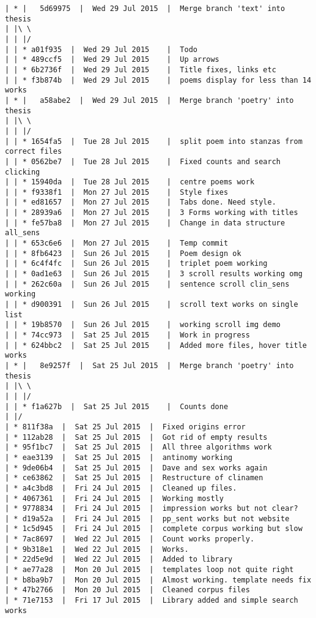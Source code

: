 \begin{verbatim}
| * |   5d69975  |  Wed 29 Jul 2015	 |  Merge branch 'text' into thesis
| |\ \  
| | |/  
| | * a01f935  |  Wed 29 Jul 2015	 |  Todo
| | * 489ccf5  |  Wed 29 Jul 2015	 |  Up arrows
| | * 6b2736f  |  Wed 29 Jul 2015	 |  Title fixes, links etc
| | * f3b874b  |  Wed 29 Jul 2015	 |  poems display for less than 14 works
| * |   a58abe2  |  Wed 29 Jul 2015	 |  Merge branch 'poetry' into thesis
| |\ \  
| | |/  
| | * 1654fa5  |  Tue 28 Jul 2015	 |  split poem into stanzas from correct files
| | * 0562be7  |  Tue 28 Jul 2015	 |  Fixed counts and search clicking
| | * 15940da  |  Tue 28 Jul 2015	 |  centre poems work
| | * f9338f1  |  Mon 27 Jul 2015	 |  Style fixes
| | * ed81657  |  Mon 27 Jul 2015	 |  Tabs done. Need style.
| | * 28939a6  |  Mon 27 Jul 2015	 |  3 Forms working with titles
| | * fe57ba8  |  Mon 27 Jul 2015	 |  Change in data structure all_sens
| | * 653c6e6  |  Mon 27 Jul 2015	 |  Temp commit
| | * 8fb6423  |  Sun 26 Jul 2015	 |  Poem design ok
| | * 6c4f4fc  |  Sun 26 Jul 2015	 |  triplet poem working
| | * 0ad1e63  |  Sun 26 Jul 2015	 |  3 scroll results working omg
| | * 262c60a  |  Sun 26 Jul 2015	 |  sentence scroll clin_sens working
| | * d900391  |  Sun 26 Jul 2015	 |  scroll text works on single list
| | * 19b8570  |  Sun 26 Jul 2015	 |  working scroll img demo
| | * 74cc973  |  Sat 25 Jul 2015	 |  Work in progress
| | * 624bbc2  |  Sat 25 Jul 2015	 |  Added more files, hover title works
| * |   8e9257f  |  Sat 25 Jul 2015	 |  Merge branch 'poetry' into thesis
| |\ \  
| | |/  
| | * f1a627b  |  Sat 25 Jul 2015	 |  Counts done
| |/  
| * 811f38a  |  Sat 25 Jul 2015	 |  Fixed origins error
| * 112ab28  |  Sat 25 Jul 2015	 |  Got rid of empty results
| * 95f1bc7  |  Sat 25 Jul 2015	 |  All three algorithms work
| * eae3139  |  Sat 25 Jul 2015	 |  antinomy working
| * 9de06b4  |  Sat 25 Jul 2015	 |  Dave and sex works again
| * ce63862  |  Sat 25 Jul 2015	 |  Restructure of clinamen
| * a4c3bd8  |  Fri 24 Jul 2015	 |  Cleaned up files.
| * 4067361  |  Fri 24 Jul 2015	 |  Working mostly
| * 9778834  |  Fri 24 Jul 2015	 |  impression works but not clear?
| * d19a52a  |  Fri 24 Jul 2015	 |  pp_sent works but not website
| * 1c5d945  |  Fri 24 Jul 2015	 |  complete corpus working but slow
| * 7ac8697  |  Wed 22 Jul 2015	 |  Count works properly.
| * 9b318e1  |  Wed 22 Jul 2015	 |  Works.
| * 22d5e9d  |  Wed 22 Jul 2015	 |  Added to library
| * ae77a28  |  Mon 20 Jul 2015	 |  templates loop not quite right
| * b8ba9b7  |  Mon 20 Jul 2015	 |  Almost working. template needs fix
| * 47b2766  |  Mon 20 Jul 2015	 |  Cleaned corpus files
| * 71e7153  |  Fri 17 Jul 2015	 |  Library added and simple search works

\end{verbatim}
